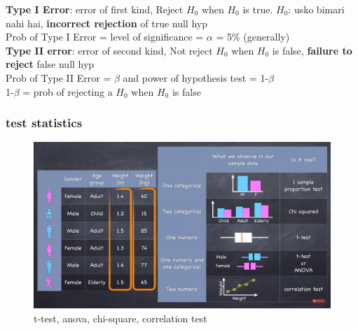 \documentclass{beamer}
\begin{document}
{%
\begin{frame}[plain]
\vspace{2.5in}
\textbf{Type I Error}: error of first kind, Reject $H_0$ when $H_0$ is true. $H_0$: usko bimari nahi hai, \textbf{incorrect rejection} of true null hyp \\
Prob of Type I Error = level of significance = $\alpha$ = 5\% (generally)\\
\textbf{Type II error}: error of second kind, Not reject $H_0$ when $H_0$ is false, \textbf{failure to reject} false null hyp \\
Prob of Type II Error = $\beta$ and power of hypothesis test = 1-$\beta$ \\
1-$\beta$ = prob of rejecting a $H_0$ when $H_0$ is false\\

\end{frame}
}%




\begin{frame}\frametitle{test statistics}%
\begin{figure}
\includegraphics[scale=0.28]{TypesTests} 
\caption{t-test, anova, chi-square, correlation test}
\end{figure}
\end{frame}
\end{document}
